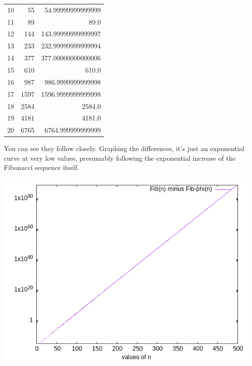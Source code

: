 \documentclass[final,fleqn,titlepage]{article}
\begin{document}
\begin{center}
\begin{tabular}{rrr}
10 & 55 & 54.99999999999999\\
11 & 89 & 89.0\\
12 & 144 & 143.99999999999997\\
13 & 233 & 232.99999999999994\\
14 & 377 & 377.00000000000006\\
15 & 610 & 610.0\\
16 & 987 & 986.9999999999998\\
17 & 1597 & 1596.9999999999998\\
18 & 2584 & 2584.0\\
19 & 4181 & 4181.0\\
20 & 6765 & 6764.999999999999\\
\end{tabular}
\end{center}

You can see they follow closely. Graphing the differences, it's just
an exponential curve at very low values, presumably following the
exponential increase of the Fibonacci sequence itself.
\begin{center}
\includegraphics[width=.9\linewidth]{fig/1-13.png}
\end{center}
\end{document}
